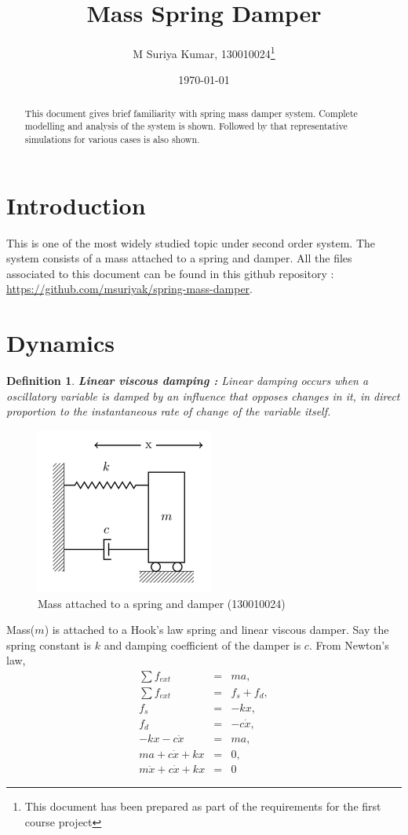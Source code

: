 \documentclass[11pt]{article}
\title{Mass Spring Damper}
\author{M Suriya Kumar, 130010024\thanks{This document has been prepared as part of the requirements for the first course project}}
\date{\today}
\newtheorem*{defn}{Definition}
\begin{document}
\maketitle
\begin{abstract}
This document gives brief familiarity with spring mass damper system. Complete modelling and analysis of 
the system is shown. Followed by that representative simulations for various cases is also shown.
\end{abstract}
\section{Introduction}
This is one of the most widely studied topic under second order system. The system consists of a mass attached to a spring and damper. All the files
associated to this document can be found in this github repository : \url{https://github.com/msuriyak/spring-mass-damper}.

\section{Dynamics}
\begin{defn}
\hfill \break
\textbf{Linear viscous damping \cite{wiki} :} Linear damping occurs when a oscillatory variable is damped 
by an influence that opposes changes in it, in direct proportion to the instantaneous rate of change 
of the variable itself.
\end{defn}

\begin{figure}[H]
	\begin{center}
	\includegraphics[scale=0.8]{source/spring_mass_damper.png}
	\caption{Mass attached to a spring and damper (130010024)}
	\centering
	\end{center}
\end{figure}

Mass($m$) is attached to a Hook's law spring and linear viscous damper. Say the spring constant 
is $k$ and damping coefficient of the damper is $c$.
\hfil \break
From Newton's law, 
\begin{eqnarray*}
\sum f_{ext} &=& ma, \\
\sum f_{ext} &=& f_s + f_d, \\
f_s &=& -kx, 	\\
f_d &=& -c\dot{x}, \\
-kx - c\dot{x} &=& ma, \\
ma + c\dot{x} + kx &=& 0, \\
m\ddot{x} + c\dot{x} + kx &=& 0
\end{eqnarray*}
\end{document}
